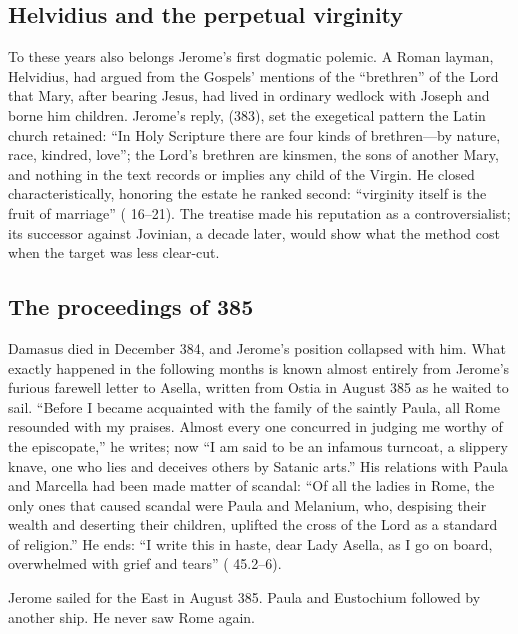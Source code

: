 \subsection{Helvidius and the perpetual virginity}

To these years also belongs Jerome's first dogmatic polemic. A Roman layman,
Helvidius, had argued from the Gospels' mentions of the ``brethren'' of the
Lord that Mary, after bearing Jesus, had lived in ordinary wedlock with
Joseph and borne him children. Jerome's reply,  (383), set the exegetical
pattern the Latin church retained: ``In Holy Scripture there are four kinds
of brethren---by nature, race, kindred, love''; the Lord's brethren are
kinsmen, the sons of another Mary, and nothing in the text records or implies
any child of the Virgin. He closed characteristically, honoring the estate he
ranked second: ``virginity itself is the fruit of marriage'' ( 16--21). The treatise made his reputation as a controversialist;
its successor against Jovinian, a decade later, would show what the method
cost when the target was less clear-cut.

\subsection{The proceedings of 385}

Damasus died in December 384, and Jerome's position collapsed with him. What
exactly happened in the following months is known almost entirely from
Jerome's furious farewell letter to Asella, written from Ostia in August 385
as he waited to sail. ``Before I became acquainted with the family of the
saintly Paula, all Rome resounded with my praises. Almost every one concurred
in judging me worthy of the episcopate,'' he writes; now ``I am said to be an
infamous turncoat, a slippery knave, one who lies and deceives others by
Satanic arts.'' His relations with Paula and Marcella had been made matter of
scandal: ``Of all the ladies in Rome, the only ones that caused scandal were
Paula and Melanium, who, despising their wealth and deserting their children,
uplifted the cross of the Lord as a standard of religion.'' He ends: ``I
write this in haste, dear Lady Asella, as I go on board, overwhelmed with
grief and tears'' ( 45.2--6).


Jerome sailed for the East in August 385. Paula and Eustochium followed by
another ship. He never saw Rome again.
